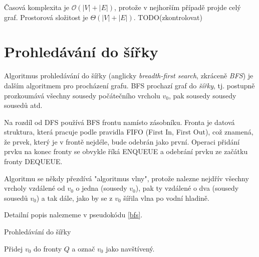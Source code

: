 \documentclass[12pt]{report}			%
\begin{document}
			
			
			Časová komplexita je $\mathcal{O}(|V| + |E|)$, protože v nejhorším případě projde celý graf. Prostorová složitost je $\Theta(|V| + |E|)$. TODO(zkontrolovat)
			
			\section{Prohledávání do šířky}
			Algoritmus prohledávání do šířky (anglicky \emph{breadth-first search}, zkráceně \emph{BFS}) je dalším algoritmem pro procházení grafu. BFS prochazí graf do \emph{šířky}, tj. postupně prozkoumává všechny sousedy počátečního vrcholu $v_0$, pak sousedy sousedy sousedů  atd. %

Na rozdíl od DFS používá BFS frontu namísto zásobníku. Fronta je datová struktura, která pracuje podle pravidla FIFO (First In, First Out), což znamená, že prvek, který je v frontě nejdéle, bude odebrán jako první. Operaci přidání prvku na konec fronty se obvykle říká ENQUEUE a odebrání prvku ze začátku fronty DEQUEUE.

Algoritmu se někdy přezdívá "algoritmus vlny", protože nalezne nejdřív všechny vrcholy vzdálené od $v_0$ o jedna (sousedy $v_0$), pak ty vzdálené o dva (sousedy sousedů $v_0$) a tak dále, jako by se z $v_0$ šířila vlna po vodní hladině.

Detailní popis nalezneme v pseudokódu \ref{bfs}.



\begin{algorithm}

			    \caption{Prohledávání do šířky}
			    \label{bfs}
  				Přidej $v_0$ do fronty $Q$ a označ $v_0$ jako navštívený.
  				
				
				
				\end{algorithm}
\end{document}
